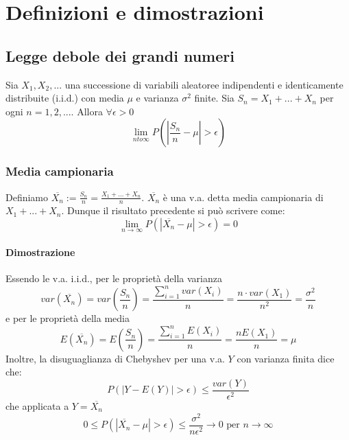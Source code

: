 \documentclass{article}
\begin{document}
	\newpage
	\section*{Definizioni e dimostrazioni}
	\subsection{Legge debole dei grandi numeri}
	Sia $X_1, X_2, ...$ una successione di variabili aleatoree indipendenti e identicamente distribuite (i.i.d.) con media $\mu$ e varianza $\sigma^2$ finite. Sia $S_n = X_1 + ... + X_n$ per ogni $n = 1,2,...$. Allora $\forall\epsilon > 0$
	\begin{equation}
		\lim\limits_{nto\infty} P\left(\left|\frac{S_n}{n} - \mu\right| > \epsilon \right)
	\end{equation}
	\subsubsection{Media campionaria}
	Definiamo $\overline{X_n} := \frac{S_n}{n} = \frac{X_1 + ... + X_n}{n}$. $\overline{X_n}$ è una v.a. detta media campionaria di $X_1+...+X_n$. Dunque il risultato precedente si può scrivere come:
	\begin{equation}
		\lim\limits_{n\to\infty} P(|\overline{X_n}-\mu|>\epsilon) = 0
	\end{equation}
	\paragraph{Dimostrazione}
	Essendo le v.a. i.i.d., per le proprietà della varianza
	\begin{equation}
		var(\overline{X_n}) = var(\frac{S_n}{n}) = \frac{\sum_{i=1}^{n} var(X_i)}{n} = \frac{n \cdot var(X_1)}{n^2} = \frac{\sigma^2}{n}
	\end{equation}
	e per le proprietà della media
	\begin{equation}
		E(\overline{X_n}) = E(\frac{S_n}{n}) = \frac{\sum_{i=1}^{n} E(X_i)}{n} = \frac{n E(X_1)}{n} = \mu
	\end{equation}
	Inoltre, la disuguaglianza di Chebyshev per una v.a. $Y$ con varianza finita dice che:
	\begin{equation}
		P(|Y-E(Y)|>\epsilon)\leq \frac{var(Y)}{\epsilon^2}
	\end{equation}
	che applicata a $Y = \overline{X_n}$
	\begin{equation}
		0\leq P(|\overline{X_n}-\mu|>\epsilon) \leq \frac{\sigma^2}{n\epsilon^2} \to 0 \text{ per } n\to\infty
	\end{equation}
	
\end{document}
